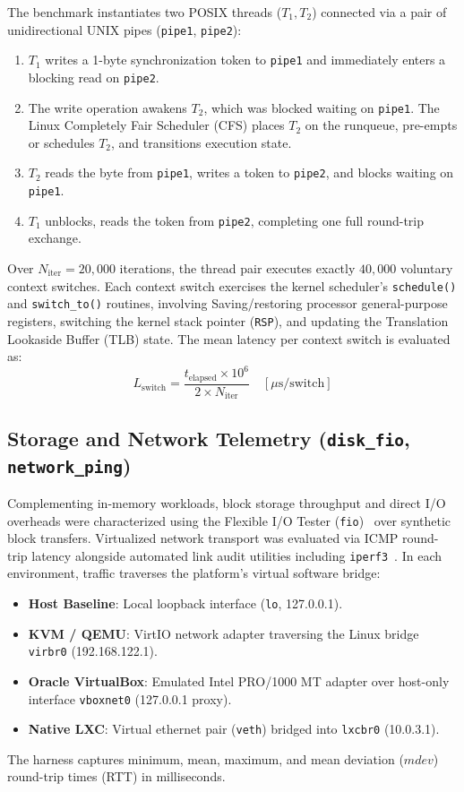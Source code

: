The benchmark instantiates two POSIX threads ($T_1, T_2$) connected via a pair of unidirectional UNIX pipes (\texttt{pipe1}, \texttt{pipe2}):
\begin{enumerate}
    \item $T_1$ writes a 1-byte synchronization token to \texttt{pipe1} and immediately enters a blocking read on \texttt{pipe2}.
    \item The write operation awakens $T_2$, which was blocked waiting on \texttt{pipe1}. The Linux Completely Fair Scheduler (CFS) places $T_2$ on the runqueue, pre-empts or schedules $T_2$, and transitions execution state.
    \item $T_2$ reads the byte from \texttt{pipe1}, writes a token to \texttt{pipe2}, and blocks waiting on \texttt{pipe1}.
    \item $T_1$ unblocks, reads the token from \texttt{pipe2}, completing one full round-trip exchange.
\end{enumerate}
Over $N_{\text{iter}} = 20,000$ iterations, the thread pair executes exactly $40,000$ voluntary context switches. Each context switch exercises the kernel scheduler's \texttt{schedule()} and \texttt{switch\_to()} routines, involving Saving/restoring processor general-purpose registers, switching the kernel stack pointer (\texttt{RSP}), and updating the Translation Lookaside Buffer (TLB) state. The mean latency per context switch is evaluated as:
\begin{equation}
    L_{\text{switch}} = \frac{t_{\text{elapsed}} \times 10^6}{2 \times N_{\text{iter}}} \quad [\mu\text{s/switch}]
\end{equation}

\subsection{Storage and Network Telemetry (\texttt{disk\_fio}, \texttt{network\_ping})}
\label{subsec:network_methodology}

Complementing in-memory workloads, block storage throughput and direct I/O overheads were characterized using the Flexible I/O Tester (\texttt{fio})~\cite{fio2024axboe} over synthetic block transfers. Virtualized network transport was evaluated via ICMP round-trip latency alongside automated link audit utilities including \texttt{iperf3}~\cite{iperf3esnet}. In each environment, traffic traverses the platform's virtual software bridge:
\begin{itemize}
    \item \textbf{Host Baseline}: Local loopback interface (\texttt{lo}, 127.0.0.1).
    \item \textbf{KVM / QEMU}: VirtIO network adapter traversing the Linux bridge \texttt{virbr0} (192.168.122.1).
    \item \textbf{Oracle VirtualBox}: Emulated Intel PRO/1000 MT adapter over host-only interface \texttt{vboxnet0} (127.0.0.1 proxy).
    \item \textbf{Native LXC}: Virtual ethernet pair (\texttt{veth}) bridged into \texttt{lxcbr0} (10.0.3.1).
\end{itemize}
The harness captures minimum, mean, maximum, and mean deviation ($mdev$) round-trip times (RTT) in milliseconds.

